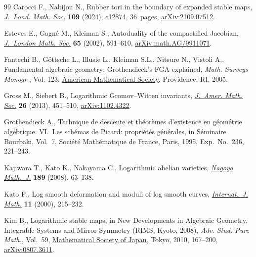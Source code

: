 \documentclass[11pt]{article}
\numberwithin{equation}{section}
\numberwithin{equation}{section}
\theoremstyle{definition}
\begin{document}
\begin{thebibliography}{99}
Carocci F., Nabijou N., Rubber tori in the boundary of expanded stable maps,
 \href{https://doi.org/10.1112/jlms.12874}{\textit{J.~Lond. Math. Soc.}}
 \textbf{109} (2024), e12874, 36~pages,
 \href{http://arxiv.org/abs/2109.07512}{arXiv:2109.07512}.

Esteves E., Gagn\'e M., Kleiman S., Autoduality of the compactified {J}acobian,
 \href{https://doi.org/10.1112/S002461070100309X}{\textit{J.~London Math.
 Soc.}} \textbf{65} (2002), 591--610,
 \href{http://arxiv.org/abs/math.AG/9911071}{arXiv:math.AG/9911071}.

Fantechi B., G\"ottsche L., Illusie L., Kleiman S.L., Nitsure N., Vistoli A.,
 Fundamental algebraic geometry: {G}rothendieck's {FGA} explained,
 \textit{Math. Surveys Monogr.}, Vol. 123,
 \href{https://doi.org/10.1090/surv/123}{American Mathematical Society},
 Providence, RI, 2005.

Gross M., Siebert B., Logarithmic {G}romov--{W}itten invariants,
 \href{https://doi.org/10.1090/S0894-0347-2012-00757-7}{\textit{J.~Amer. Math.
 Soc.}} \textbf{26} (2013), 451--510,
 \href{http://arxiv.org/abs/1102.4322}{arXiv:1102.4322}.

Grothendieck A., Technique de descente et th\'eor\`emes d'existence en
 g\'eom\'etrie alg\'ebrique. {VI}.~{L}es sch\'emas de {P}icard: propri\'et\'es
 g\'en\'erales, in S\'eminaire {B}ourbaki, {V}ol.~7, Soci\'et\'e
 Math\'ematique de France, Paris, 1995, Exp.~No.~236, 221--243.

Kajiwara T., Kato K., Nakayama C., Logarithmic abelian varieties,
 \href{https://doi.org/10.1017/S002776300000951X}{\textit{Nagoya Math.~J.}}
 \textbf{189} (2008), 63--138.

Kato F., Log smooth deformation and moduli of log smooth curves,
 \href{https://doi.org/10.1142/S0129167X0000012X}{\textit{Internat.~J. Math.}}
 \textbf{11} (2000), 215--232.

Kim B., Logarithmic stable maps, in New {D}evelopments in {A}lgebraic
 {G}eometry, {I}ntegrable {S}ystems and {M}irror {S}ymmetry ({RIMS}, {K}yoto,
 2008), \textit{Adv. Stud. Pure Math.}, Vol.~59,
 \href{https://doi.org/10.2969/aspm/05910167}{Mathematical Society of Japan},
 Tokyo, 2010, 167--200,
 \href{http://arxiv.org/abs/0807.3611}{arXiv:0807.3611}.


\end{thebibliography}
\end{document}
